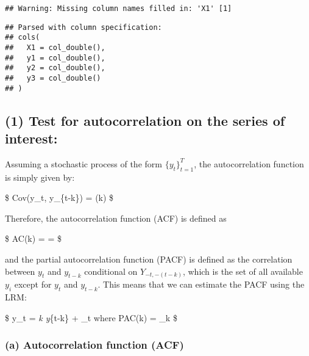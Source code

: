 \documentclass[]{article}
\newenvironment{Shaded}{\begin{snugshade}}{\end{snugshade}}
\newcommand{\CommentTok}[1]{\textcolor[rgb]{0.56,0.35,0.01}{\textit{#1}}}
\newcommand{\NormalTok}[1]{#1}
\newcommand{\OtherTok}[1]{\textcolor[rgb]{0.56,0.35,0.01}{#1}}
\newcommand{\SpecialCharTok}[1]{\textcolor[rgb]{0.00,0.00,0.00}{#1}}
\begin{document}
\begin{verbatim}
## Warning: Missing column names filled in: 'X1' [1]
\end{verbatim}

\begin{verbatim}
## Parsed with column specification:
## cols(
##   X1 = col_double(),
##   y1 = col_double(),
##   y2 = col_double(),
##   y3 = col_double()
## )
\end{verbatim}

\begin{Shaded}
\end{Shaded}

\hypertarget{test-for-autocorrelation-on-the-series-of-interest}{%
\subsection{\texorpdfstring{\textbf{(1)} Test for autocorrelation on the
series of
interest:}{(1) Test for autocorrelation on the series of interest:}}\label{test-for-autocorrelation-on-the-series-of-interest}}

Assuming a stochastic process of the form \(\{y_t\}_{t=1}^{T}\), the
autocorrelation function is simply given by:

\$ Cov(y\_t, y\_\{t-k\}) = \gamma(k) \$

Therefore, the autocorrelation function (ACF) is defined as

\$ AC(k) =  =
 \$

and the partial autocorrelation function (PACF) is defined as the
correlation between \(y_t\) and \(y_{t-k}\) conditional on
\(Y_{-t, -(t-k)}\), which is the set of all available \(y_i\) except for
\(y_t\) and \(y_{t-k}\). This means that we can estimate the PACF using
the LRM:

\$ y\_t = \rho\emph{k y}\{t-k\} + \epsilon\_t \quad where \quad PAC(k) =
\rho\_k \$

\hypertarget{a-autocorrelation-function-acf}{%
\subsubsection{\texorpdfstring{\textbf{(a)} Autocorrelation function
(ACF)}{(a) Autocorrelation function (ACF)}}\label{a-autocorrelation-function-acf}}
\end{document}
